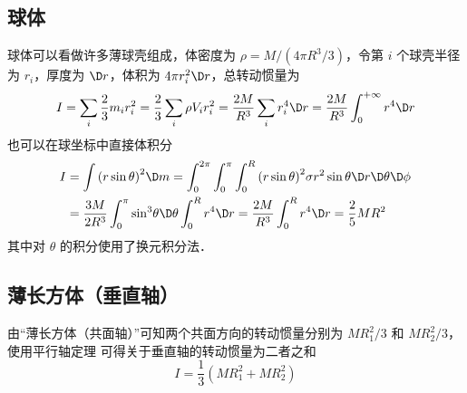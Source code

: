 \subsection{球体}
球体可以看做许多薄球壳组成，体密度为 $\rho  = M/(4\pi {R^3}/3)$，令第 $i$ 个球壳半径为 $r_i$，厚度为 $\D r$，体积为 $4\pi r_i^2\D r$，总转动惯量为
\begin{equation}
I = \sum_i \frac{2}{3} m_i r_i^2  = \frac{2}{3}\sum_i \rho {V_i} r_i^2  = \frac{2M}{R^3}\sum_i r_i^4\D r  = \frac{2M}{R^3} \int_0^{+\infty } r^4 \D r
\end{equation}
也可以在球坐标中直接体积分
\begin{equation}
\begin{aligned}
I &= \int {{{(r\sin \theta )}^2}\D m}  = \int_0^{2\pi } {\int_0^\pi  {\int_0^R {{{(r\sin \theta )}^2}\sigma {r^2}\sin \theta \D r\D\theta \D\phi } } } \\
&= \frac{3M}{2R^3}\int_0^\pi  {{{\sin }^3}\theta \D\theta } \int_0^R {{r^4}\D r}  =\frac{2M}{R^3}\int_0^R {{r^4}\D r}  = \frac{2}{5}M{R^2}
\end{aligned}
\end{equation}
其中对 $\theta$ 的积分使用了换元积分法．%

\subsection{薄长方体（垂直轴）}
由“薄长方体（共面轴）”可知两个共面方向的转动惯量分别为 $MR_1^2/3$ 和 $MR_2^2/3$，使用平行轴定理%
可得关于垂直轴的转动惯量为二者之和
\begin{equation}
I = \frac{1}{3} (MR_1^2+MR_2^2)
\end{equation}